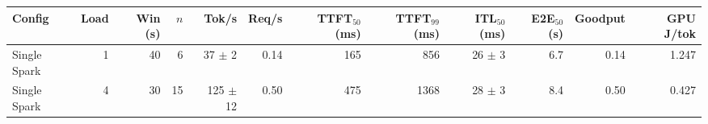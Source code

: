 \begin{tabular}{l r r r r r r r r r r r}
\toprule
Config & Load & Win (s) & $n$ & Tok/s & Req/s & TTFT$_{50}$ (ms) & TTFT$_{99}$ (ms) & ITL$_{50}$ (ms) & E2E$_{50}$ (s) & Goodput & GPU J/tok \\
\midrule
Single Spark & 1 & 40 & 6\rlap{$^\dagger$} & 37 $\pm$ 2 & 0.14 & 165 & 856 & 26 $\pm$ 3 & 6.7 & 0.14 & 1.247 \\
Single Spark & 4 & 30 & 15\rlap{$^\dagger$} & 125 $\pm$ 12 & 0.50 & 475 & 1368 & 28 $\pm$ 3 & 8.4 & 0.50 & 0.427 \\
\bottomrule
\end{tabular}
